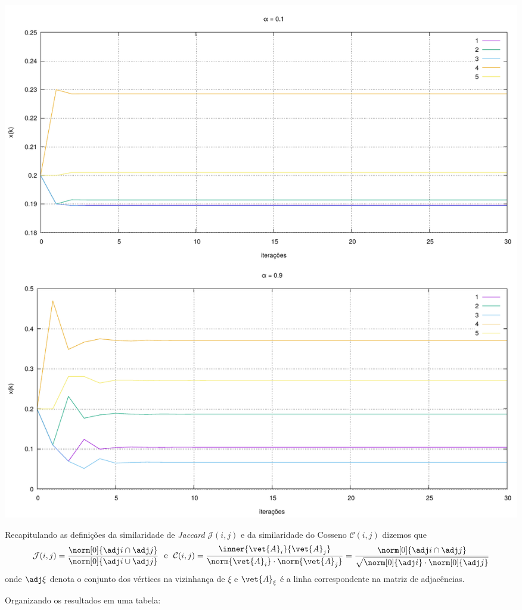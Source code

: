 \documentclass[l15, tikzdraw]{homework}
\begin{document}
	\begin{fig}
		\includegraphics[width=\textwidth]{"../src/plot/pagerank.pdf"}
	\end{fig}


	\begin{fig}
		
	\end{fig}

	\subquest{}%
	Recapitulando as definições da similaridade de \textit{Jaccard} $\mathcal{J}(i, j)$ e da similaridade do Cosseno $\mathcal{C}(i, j)$ dizemos que
		$$\mathcal{J}(i, j) = \frac{\norm[0]{\adj i \cap \adj j}}{\norm[0]{\adj i \cup \adj j}} ~\text{ e }~ \mathcal{C}(i, j) = \frac{\inner{\vet{A}_i}{\vet{A}_j}}{\norm{\vet{A}_i} \cdot \norm{\vet{A}_j}} = \frac{\norm[0]{\adj i \cap \adj j}}{\sqrt{\norm[0]{\adj i} \cdot \norm[0]{\adj j}}}$$
	onde $\adj \xi$ denota o conjunto dos vértices na vizinhança de $\xi$ e $\vet{A}_\xi$ é a linha correspondente na matriz de adjacências.\par

	Organizando os resultados em uma tabela:
\end{document}
